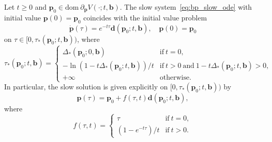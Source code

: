\documentclass[10pt,a4paper]{amsart}
\def\bb {\boldsymbol{b}}
\def\bd {\boldsymbol{d}}
\def\bp {\boldsymbol{p}}
\def\bpo {\bp_{0}}
\def\dom {\mathrm{dom~}}    %
\begin{document}
\begin{thm}\label{thm:mr_local_sol}
Let $t \geqslant 0$ and $\bpo \in \dom \partial_{\bp} V(\cdot;t,\bb)$. The slow system~\eqref{eq:bp_slow_ode} with initial value $\bp(0) = \bpo$ coincides with the initial value problem
\begin{equation}\label{eq:dd_decay}
\dot{\bp}(\tau) = e^{-t\tau}\bd(\bpo;t,\bb), \quad \bp(0) = \bpo
\end{equation}
on $\tau \in [0,\tau_{*}(\bpo;t,\bb))$, where 
\begin{equation}\label{eq:thm_tau0}
\tau_{*}(\bpo;t,\bb) = 
\begin{cases}
    \Delta_{*}(\bpo;0,\bb) & \text{if} \ t = 0, \\
    -\ln\left(1-t\Delta_{*}(\bpo;t,\bb)\right)/t & \text{if} \ t > 0 \ \text{and} \ 1-t\Delta_{*}(\bpo;t,\bb) > 0, \\
    +\infty & \text{otherwise}.
\end{cases}
\end{equation}
In particular, the slow solution is given explicitly on $[0,\tau_{*}(\bpo;t,\bb))$ by
\begin{equation}\label{eq:slow_local_solution}
    \bp(\tau) = \bpo + f(\tau,t)\bd(\bpo;t,\bb),
\end{equation}
where 
\begin{equation}\label{eq:f_fun}
f(\tau,t) = \begin{cases}
    \tau & \text{if} \ t = 0,\\
    \left(1 - e^{-t\tau}\right)/t & \text{if} \ t > 0.
\end{cases}
\end{equation}
\end{thm}
\end{document}
